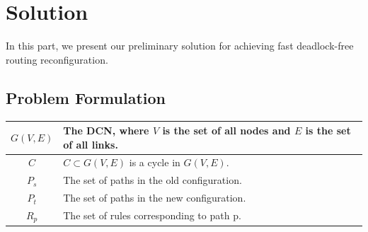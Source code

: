 \section{Solution}\label{sec:solution}

In this part, we present our preliminary solution for achieving fast deadlock-free routing reconfiguration.

\subsection{Problem Formulation}\label{subsec:formulation}

\begin{table}
\begin{tabularx}{0.48\textwidth}{ |c||X| } 
	\hline
	$G(V,E)$ & The DCN, where $V$ is the set of all nodes and $E$ is the set of all links. \\ 
	\hline
	$C$ & $C \subset G(V,E)$ is a cycle in $G(V,E)$. \\ 
	\hline
	$P_s$ & The set of paths in the old configuration. \\
	\hline
	$P_t$ & The set of paths in the new configuration. \\
	\hline
	$R_p$ & The set of rules corresponding to path p. \\
	\hline


\end{tabularx}
\end{table}

